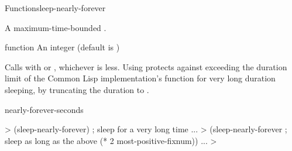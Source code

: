 \begin{functiondoc}{Function}{sleep-nearly-forever}{
    }

\fnsyntax

\fnpurpose A maximum-time-bounded .

\fnpackage {}

\fnmodule {}

\fnargs
\begin{args}{function}
\arg[seconds] An integer (default is 
  )
\end{args}

\fndescription 
%
%
%
%
Calls  with  or , whichever is less.  Using  protects against exceeding the duration limit of the Common Lisp implementation's  function for very long duration sleeping, by truncating the duration to .


\begin{alsos}{nearly-forever-seconds}
\end{alsos}

\fnexamples
%
\W\supp
\begin{example}
  > (sleep-nearly-forever)    ; sleep for a very long time
        ...
  > (sleep-nearly-forever     ; sleep as long as the above
       (* 2 most-positive-fixnum))
        ...
  >
\end{example}

\end{functiondoc}


